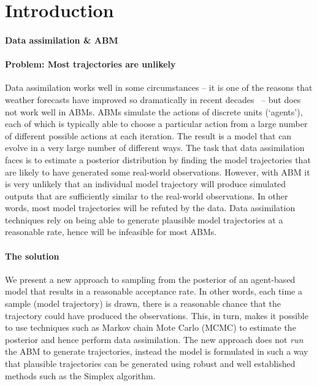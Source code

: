 \section{Introduction}

\paragraph{Data assimilation \& ABM}


\paragraph{Problem: Most trajectories are unlikely}

Data assimilation works well in some circumstances -- it is one of the reasons that weather forecasts have improved so dramatically in recent decades~\cite{kalnay_atmospheric_2003} -- but does not work well in ABMs. ABMs simulate the actions of discrete units (`agents'), each of which is typically able to choose a particular action from a large number of different possible actions at each iteration. The result is a model that can evolve in a very large number of different ways. The task that data assimilation faces is to estimate a posterior distribution by finding the model trajectories that are likely to have generated some real-world observations. However, with ABM it is very unlikely that an individual model trajectory will produce simulated outputs that are sufficiently similar to the real-world observations. In other words, most model trajectories will be refuted by the data. Data assimilation techniques rely on being able to generate plausible model trajectories at a reasonable rate, hence will be infeasible for most ABMs.

\paragraph{The solution}

We present a new approach to sampling from the posterior of an agent-based model that results in a reasonable acceptance rate. In other words, each time a sample (model trajectory) is drawn, there is a reasonable chance that the trajectory could have produced the observations.  This, in turn, makes it possible to use techniques such as Markov chain Mote Carlo (MCMC) to estimate the posterior and hence perform data assimilation. The new approach does not \textit{run} the ABM to generate trajectories, instead the model is formulated in such a way that plausible trajectories can be generated using robust and well established methods such as the Simplex algorithm. 

